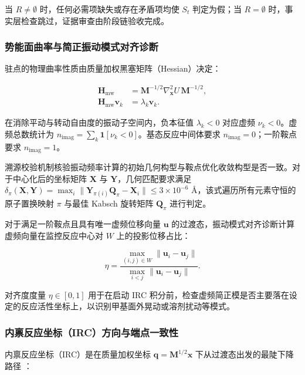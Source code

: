 当 $R\ne\emptyset$ 时，任何必需项缺失或存在矛盾项均使 $S_t$ 判定为假；当 $R=\emptyset$ 时，事实层检查跳过，证据审查由阶段链验收完成。

\subsubsection{势能面曲率与简正振动模式对齐诊断}
驻点的物理曲率性质由质量加权黑塞矩阵（Hessian）决定：

\begin{equation}\label{eq:methods-10}
\begin{aligned}
\mathbf{H}_{\mathrm{mw}}&=\mathbf{M}^{-1/2}\nabla_{\mathbf{x}}^2 U\,\mathbf{M}^{-1/2},\\
\mathbf{H}_{\mathrm{mw}}\mathbf{v}_k&=\lambda_k\mathbf{v}_k.
\end{aligned}
\end{equation}

在消除平动与转动自由度的振动子空间内，负本征值 $\lambda_k<0$ 对应虚频 $\nu_k<0$。虚频总数统计为 $n_{\mathrm{imag}}=\sum_k \mathbf{1}[\nu_k<0]$。基态反应中间体要求 $n_{\mathrm{imag}}=0$；一阶鞍点要求 $n_{\mathrm{imag}}=1$。

溯源校验机制核验振动频率计算的初始几何构型与鞍点优化收敛构型是否一致。对于中心化后的坐标矩阵 $\mathbf{X}$ 与 $\mathbf{Y}$，几何匹配要求满足 $\delta_\pi(\mathbf{X},\mathbf{Y})=\max_i\|\mathbf{Y}_{\pi(i)}\mathbf{Q}_\pi-\mathbf{X}_i\|\le 3\times 10^{-6}\text{ Å}$，该式遍历所有元素守恒的原子置换映射 $\pi$ 与最佳 Kabsch 旋转矩阵 $\mathbf{Q}_\pi$ 进行判定。

对于满足一阶鞍点且具有唯一虚频位移向量 $\mathbf{u}$ 的过渡态，振动模式对齐诊断计算虚频向量在监控反应中心对 $W$ 上的投影位移占比：

\begin{equation}\label{eq:methods-11}
\eta=\frac{\max_{(i,j)\in W}\|\mathbf{u}_i-\mathbf{u}_j\|}{\max_{i<j}\|\mathbf{u}_i-\mathbf{u}_j\|}.
\end{equation}

对齐度度量 $\eta\in[0,1]$ 用于在启动 IRC 积分前，检查虚频简正模是否主要落在设定的反应活性坐标上，以识别甲基面外晃动或溶剂扰动等模式。

\subsubsection{内禀反应坐标（IRC）方向与端点一致性}
内禀反应坐标（IRC）是在质量加权坐标 $\mathbf{q}=\mathbf{M}^{1/2}\mathbf{x}$ 下从过渡态出发的最陡下降路径 \citep{ref09,ref10}：

